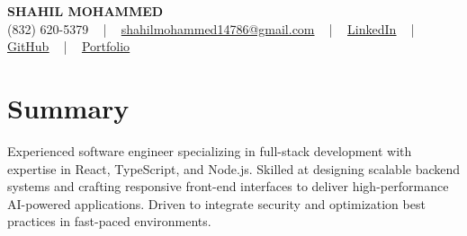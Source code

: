 \documentclass[letterpaper,10pt]{article}
\begin{document}
\begin{center}
    {\fontsize{14pt}{12pt}\selectfont \textbf{\MakeUppercase{Shahil Mohammed}}}\\ \vspace{2pt}
    \fontsize{10pt}{12pt}\selectfont (832) 620-5379 ~ | ~ \href{mailto:shahilmohammed14786@gmail.com}{shahilmohammed14786@gmail.com} ~ | ~  
    \href{https://www.linkedin.com/in/shahil-mohammed-9652931a1/}{\color{blue}\underline{LinkedIn}}  ~ | ~ 
    \href{https://github.com/freakbeast14}{\color{blue}\underline{GitHub}} ~ | ~ 
    \href{https://shahil-mohammed.netlify.app/}{\color{blue}\underline{Portfolio}}
    \vspace{-8pt}
\end{center}

\section{Summary}
\vspace{-2pt}\fontsize{8pt}{9pt}\selectfont
Experienced software engineer specializing in full-stack development with expertise in React, TypeScript, and Node.js. Skilled at designing scalable backend systems and crafting responsive front-end interfaces to deliver high-performance AI-powered applications. Driven to integrate security and optimization best practices in fast-paced environments.
 \vspace{-5pt}
 
\vspace{-2pt}
\end{document}
